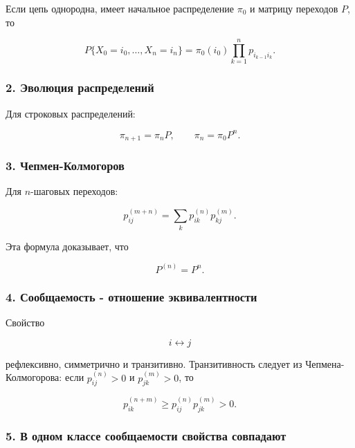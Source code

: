 \documentclass[
  11pt,
  a4paper,
]{article}
\begin{document}
Если цепь однородна, имеет начальное распределение \(\pi_0\) и матрицу
переходов \(P\), то

\[
P\{X_0=i_0,\ldots,X_n=i_n\}
=
\pi_0(i_0)\prod_{k=1}^n p_{i_{k-1}i_k}.
\]

\subsubsection{2. Эволюция
распределений}\label{ux44dux432ux43eux43bux44eux446ux438ux44f-ux440ux430ux441ux43fux440ux435ux434ux435ux43bux435ux43dux438ux439}

Для строковых распределений:

\[
\pi_{n+1}=\pi_nP,
\qquad
\pi_n=\pi_0P^n.
\]

\subsubsection{3.
Чепмен-Колмогоров}\label{ux447ux435ux43fux43cux435ux43d-ux43aux43eux43bux43cux43eux433ux43eux440ux43eux432}

Для \(n\)-шаговых переходов:

\[
p_{ij}^{(m+n)}
=
\sum_kp_{ik}^{(n)}p_{kj}^{(m)}.
\]

Эта формула доказывает, что

\[
P^{(n)}=P^n.
\]

\subsubsection{4. Сообщаемость - отношение
эквивалентности}\label{ux441ux43eux43eux431ux449ux430ux435ux43cux43eux441ux442ux44c---ux43eux442ux43dux43eux448ux435ux43dux438ux435-ux44dux43aux432ux438ux432ux430ux43bux435ux43dux442ux43dux43eux441ux442ux438}

Свойство

\[
i\leftrightarrow j
\]

рефлексивно, симметрично и транзитивно. Транзитивность следует из
Чепмена-Колмогорова: если \(p_{ij}^{(n)}>0\) и \(p_{jk}^{(m)}>0\), то

\[
p_{ik}^{(n+m)}
\ge
p_{ij}^{(n)}p_{jk}^{(m)}
>0.
\]

\subsubsection{5. В одном классе сообщаемости свойства
совпадают}\label{ux432-ux43eux434ux43dux43eux43c-ux43aux43bux430ux441ux441ux435-ux441ux43eux43eux431ux449ux430ux435ux43cux43eux441ux442ux438-ux441ux432ux43eux439ux441ux442ux432ux430-ux441ux43eux432ux43fux430ux434ux430ux44eux442}
\end{document}
